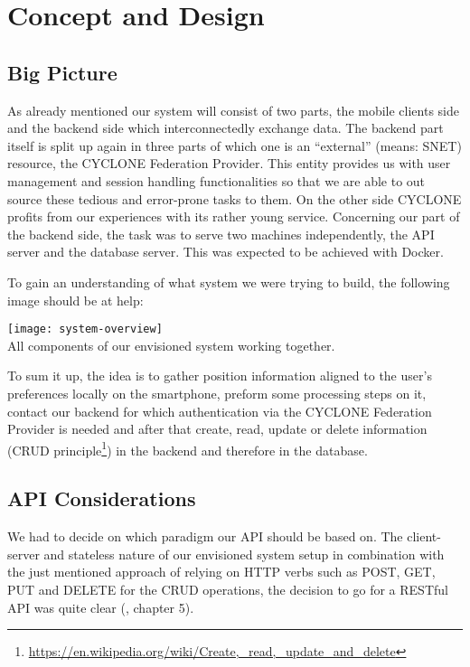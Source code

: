 \chapter{Concept and Design}
\label{cha:conceptanddesign}


\section{Big Picture}

As already mentioned our system will consist of two parts, the mobile clients side and the backend side which interconnectedly exchange data. The backend part itself is split up again in three parts of which one is an \enquote{external} (means: SNET) resource, the CYCLONE Federation Provider. This entity provides us with user management and session handling functionalities so that we are able to out source these tedious and error-prone tasks to them. On the other side CYCLONE profits from our experiences with its rather young service. Concerning our part of the backend side, the task was to serve two machines independently, the API server and the database server. This was expected to be achieved with Docker.

To gain an understanding of what system we were trying to build, the following image should be at help:

\begin{center}
    \texttt{[image: system-overview]}\\
    All components of our envisioned system working together.
\end{center}

To sum it up, the idea is to gather position information aligned to the user's preferences locally on the smartphone, preform some processing steps on it, contact our backend for which authentication via the CYCLONE Federation Provider is needed and after that create, read, update or delete information (CRUD principle\footnote{\url{https://en.wikipedia.org/wiki/Create,_read,_update_and_delete}}) in the backend and therefore in the database.


\vspace{0.5cm}

\section{API Considerations}

We had to decide on which paradigm our API should be based on. The client-server and stateless nature of our envisioned system setup in combination with the just mentioned approach of relying on HTTP verbs such as POST, GET, PUT and DELETE for the CRUD operations, the decision to go for a RESTful API was quite clear (\cite{fielding2000architectural}, chapter 5).

